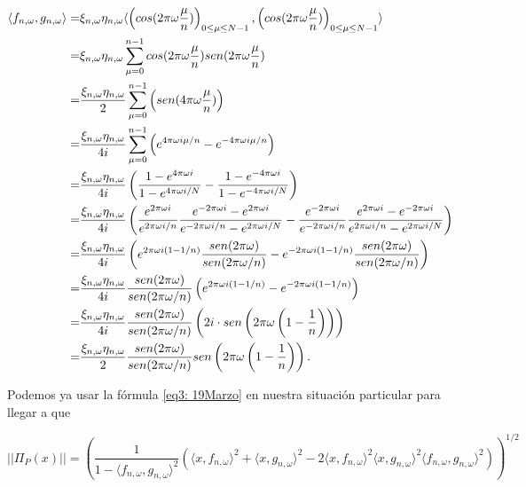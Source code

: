 \begin{align*}
\langle f_{n,\omega} , g_{n, \omega} \rangle = &
\xi_{n, \omega} \eta_{n, \omega} \langle 
\left( cos (2 \pi \omega \frac{\mu }{n}) \right)_{0 \leq \mu \leq N-1} ,  
\left( cos (2 \pi \omega \frac{\mu }{n}) \right)_{0 \leq \mu \leq N-1} \rangle \\
= & \xi_{n, \omega} \eta_{n, \omega} \sum\limits_{\mu=0}^{n-1}
cos (2 \pi \omega \frac{\mu }{n}) sen(2 \pi \omega \frac{\mu }{n}) \\
= & \frac{\xi_{n, \omega} \eta_{n, \omega}}{2}
\sum\limits_{\mu=0}^{n-1}
\left( sen(4 \pi \omega \frac{\mu}{n}) \right) \\
= & \frac{\xi_{n, \omega} \eta_{n, \omega}}{4i} \sum\limits_{\mu=0}^{n-1}
\left( e^{4 \pi \omega i \mu/n} - 
e^{-4 \pi \omega i \mu/n} \right) \\
= & \frac{\xi_{n, \omega} \eta_{n, \omega}}{4i} 
\left(
\frac{1-e^{4 \pi \omega i }}{1-e^{4 \pi \omega i /N}} - 
\frac{1-e^{-4 \pi \omega i }}{1-e^{-4 \pi \omega i /N}} 
\right) \\
= & \frac{\xi_{n, \omega} \eta_{n, \omega}}{4i} 
\left(
\frac{e^{2 \pi \omega i }}{e^{2 \pi \omega i/n }}
\frac{e^{-2 \pi \omega i }-e^{2 \pi \omega i }}{e^{-2 \pi \omega i/n }-e^{2 \pi \omega i /N}} - 
\frac{e^{-2 \pi \omega i }}{e^{-2 \pi \omega i/n }}
\frac{e^{2 \pi \omega i }-e^{-2 \pi \omega i }}{e^{2 \pi \omega i/n }-e^{2 \pi \omega i /N}} 
\right) \\
= & 
\frac{\xi_{n, \omega} \eta_{n, \omega}}{4i} 
\left(
e^{2 \pi \omega i \left( 1-1/n \right)}
\frac{sen(2 \pi \omega)}{sen(2 \pi \omega /n)} - 
e^{-2 \pi \omega i \left( 1-1/n \right)}
\frac{sen(2 \pi \omega)}{sen(2 \pi \omega /n)}
\right) 
\\
= & 
\frac{\xi_{n, \omega} \eta_{n, \omega}}{4i} 
\frac{sen(2 \pi \omega)}{sen(2 \pi \omega /n)}
\left(
e^{2 \pi \omega i \left( 1-1/n \right)} - e^{-2 \pi \omega i \left( 1-1/n \right)}
\right) \\
= &
\frac{\xi_{n, \omega} \eta_{n, \omega}}{4i} 
\frac{sen(2 \pi \omega)}{sen(2 \pi \omega /n)}
\left(
2i \cdot  sen \left( 2 \pi \omega  \left( 1- \frac{1}{n} \right) \right)
\right)\\
= & 
\frac{\xi_{n, \omega} \eta_{n, \omega}}{2} 
\frac{sen(2 \pi \omega)}{sen(2 \pi \omega /n)}
sen \left( 2 \pi \omega  \left( 1- \frac{1}{n} \right) \right). \\
\end{align*}


\QEDB
\vspace{0.2cm}


Podemos ya usar la
fórmula \eqref{eq3: 19Marzo} en nuestra situación particular para llegar a que

\[
|| \Pi_{P}(x) ||=
		\left(		  
		  \frac{1}{1- \langle f_{n, \omega }, g_{n, \omega } \rangle^{2}} \left(  
	       \langle x, f_{n, \omega } \rangle^{2} +  \langle x, g_{n, \omega } \rangle^{2}	
	       -2  \langle x, f_{n, \omega } \rangle^{2} \langle x, g_{n, \omega } \rangle^{2} \langle f_{n, \omega }, g_{n, \omega } \rangle^{2}	  
		  \right)
		  \right) ^{1/2}
\]


